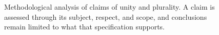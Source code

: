 \begin{figure}[htbp]

    \caption{Methodological analysis of claims of unity and plurality. A
    claim is assessed through its subject, respect, and scope, and
    conclusions remain limited to what that specification
    supports.}
    \label{fig:analysis-of-unity-and-plurality-claims}
\end{figure}

